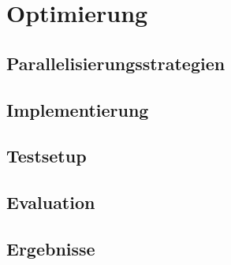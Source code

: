 \chapter{Optimierung}

\section{Parallelisierungsstrategien}
\section{Implementierung}
\section{Testsetup}
\section{Evaluation}
\section{Ergebnisse}